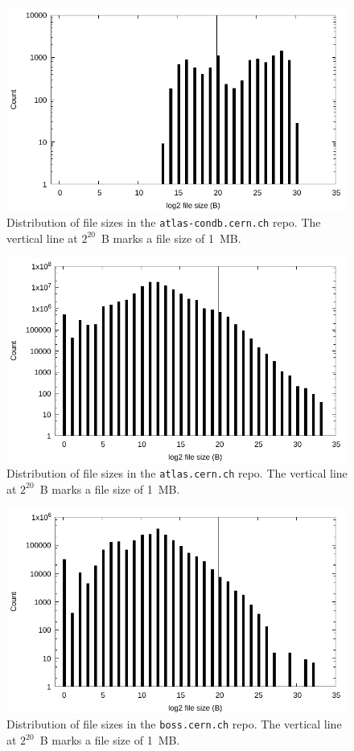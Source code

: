 \documentclass[conference]{IEEEtran}
\begin{document}
\begin{figure}
\includegraphics[width=\linewidth]{plots/file-hist/atlas-condb.pdf}
\caption{Distribution of file sizes in the \texttt{atlas-condb.cern.ch} repo.
The vertical line at $2^{20}$~B marks a file size of 1~MB.}
\end{figure}

\begin{figure}
\includegraphics[width=\linewidth]{plots/file-hist/atlas.pdf}
\caption{Distribution of file sizes in the \texttt{atlas.cern.ch} repo.
The vertical line at $2^{20}$~B marks a file size of 1~MB.}
\end{figure}

\begin{figure}
\includegraphics[width=\linewidth]{plots/file-hist/boss.pdf}
\caption{Distribution of file sizes in the \texttt{boss.cern.ch} repo.
The vertical line at $2^{20}$~B marks a file size of 1~MB.}
\end{figure}
\end{document}
